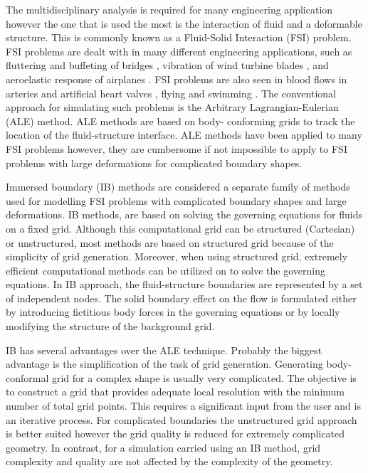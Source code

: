 The multidisciplinary analysis is required for many engineering application however the one that is used the most is the interaction of fluid and a deformable structure. This is commonly known as a Fluid-Solid Interaction (FSI) problem. FSI problems are dealt with in many different engineering applications, such as fluttering and buffeting of bridges \cite{jain1996coupled}, vibration of wind turbine blades \cite{arrigan2011control}, and aeroelastic response of airplanes \cite{farhat2006provably}. FSI problems are also seen in blood flows in arteries and artificial heart valves \cite{sotiropoulos2009review}, flying and swimming \cite{kern2006simulations}. The conventional approach for simulating such problems is the Arbitrary Lagrangian-Eulerian (ALE) method. ALE methods are based on body- conforming grids to track the location of the fluid-structure interface. ALE methods have been applied to many FSI problems however, they are cumbersome if not impossible to apply to FSI problems with large deformations for complicated boundary shapes.

Immersed boundary (IB) methods are considered a separate family of methods used for modelling FSI problems with complicated boundary shapes and large deformations. IB methods, are based on solving the governing equations for fluids on a fixed grid. Although this computational grid can be structured (Cartesian) or unstructured, most methods are based on structured grid because of the simplicity of grid generation. Moreover, when using structured grid, extremely efficient computational methods can be utilized on to solve the governing equations. In IB approach, the fluid-structure boundaries are represented by a set of independent nodes. The solid boundary effect on the flow is formulated either by introducing fictitious body forces in the governing equations or by locally modifying the structure of the background grid.

IB has several advantages over the ALE technique. Probably the biggest advantage is the simplification of the task of grid generation. Generating body-conformal grid for a complex shape is usually very complicated. The objective is to construct a grid that provides adequate local resolution with the minimum number of total grid points.  This requires a significant input from the user and is an iterative process. For complicated boundaries the unstructured grid approach is better suited however the grid quality is reduced for extremely complicated geometry. In contrast, for a simulation carried using an IB method, grid complexity and quality are not affected by the complexity of the geometry. 

